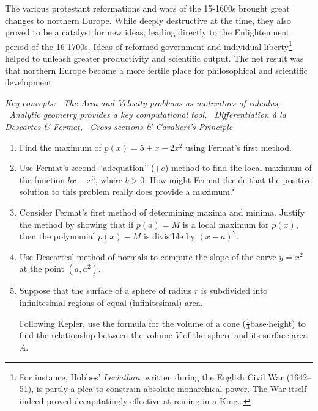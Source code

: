 The various protestant reformations and wars of the 15-1600s brought great changes to northern Europe. While deeply destructive at the time, they also proved to be a catalyst for new ideas, leading directly to the Enlightenment period of the 16-1700s. Ideas of reformed government and individual liberty\footnote{%
	For instance, Hobbes' \emph{Leviathan}, written during the English Civil War (1642--51), is partly a plea to constrain absolute monarchical power. The War itself indeed proved decapitatingly effective at reining in a King\ldots%
}
helped to unleash greater productivity and scientific output. The net result was that northern Europe became a more fertile place for philosophical and scientific development.

\vfil

\begin{exercises}{}{}
	\hangindent\leftmargini\emph{Key concepts: \ The Area and Velocity problems as motivators of calculus, \ Analytic geometry provides a key computational tool, \ Differentiation à la Descartes \& Fermat, \ Cross-sections \& Cavalieri's Principle}
	
	
	\begin{enumerate}
	  \item Find the maximum of $p(x)=5+x-2x^2$ using Fermat's first method.
	  
		\item%
		Use Fermat's second ``adequation'' ($+e$) method to find the local maximum of the function $bx-x^3$, where $b>0$. How might Fermat decide that the positive solution to this problem really does provide a maximum?
	  
		\item%
		Consider Fermat's first method of determining maxima and minima. Justify the method by showing that if $p(a)=M$ is a local maximum for $p(x)$, then the polynomial $p(x)-M$ is divisible by $(x-a)^2$.
		
		\item Use Descartes' method of normals to compute the slope of the curve $y=x^2$ at the point $(a,a^2)$.
		
		\item Suppose that the surface of a sphere of radius $r$ is subdivided into infinitesimal regions of equal (infinitesimal) area.\par
		Following Kepler, use the formula for the volume of a cone ($\frac 13$base$\cdot$height)	to find the relationship between the volume $V$ of the sphere and its surface area $A$.
			

\end{enumerate}
\end{exercises}
